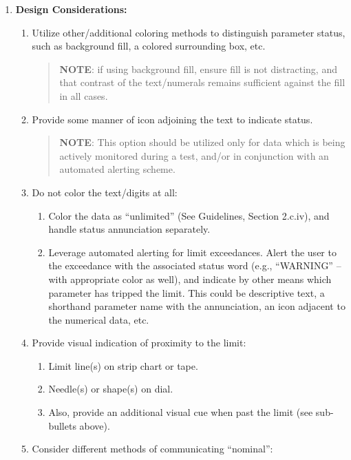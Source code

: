 \documentclass[
]{book}
\providecommand{\tightlist}{%
  \setlength{\itemsep}{0pt}\setlength{\parskip}{0pt}}
\begin{document}
\begin{enumerate}
\def\labelenumi{\arabic{enumi}.}
\tightlist
\item
  \textbf{Design Considerations:}

  \begin{enumerate}
  \def\labelenumii{\alph{enumii}.}
  \item
    Utilize other/additional coloring methods to distinguish parameter status, such as background fill, a colored surrounding box, etc.

    \begin{quote}
    \textbf{NOTE}: if using background fill, ensure fill is not distracting, and that contrast of the text/numerals remains sufficient against the fill in all cases.
    \end{quote}
  \item
    Provide some manner of icon adjoining the text to indicate status.

    \begin{quote}
    \textbf{NOTE}: This option should be utilized only for data which is being actively monitored during a test, and/or in conjunction with an automated alerting scheme.
    \end{quote}
  \item
    Do not color the text/digits at all:

    \begin{enumerate}
    \def\labelenumiii{\arabic{enumiii}.}
    \tightlist
    \item
      Color the data as ``unlimited'' (See Guidelines, Section 2.c.iv), and handle status annunciation separately.
    \item
      Leverage automated alerting for limit exceedances. Alert the user to the exceedance with the associated status word (e.g., ``WARNING'' -- with appropriate color as well), and indicate by other means which parameter has tripped the limit. This could be descriptive text, a shorthand parameter name with the annunciation, an icon adjacent to the numerical data, etc.
    \end{enumerate}
  \item
    Provide visual indication of proximity to the limit:

    \begin{enumerate}
    \def\labelenumiii{\arabic{enumiii}.}
    \tightlist
    \item
      Limit line(s) on strip chart or tape.
    \item
      Needle(s) or shape(s) on dial.
    \item
      Also, provide an additional visual cue when past the limit (see sub-bullets above).
    \end{enumerate}
  \item
    Consider different methods of communicating ``nominal'':


\end{enumerate}
\end{enumerate}
\end{document}

